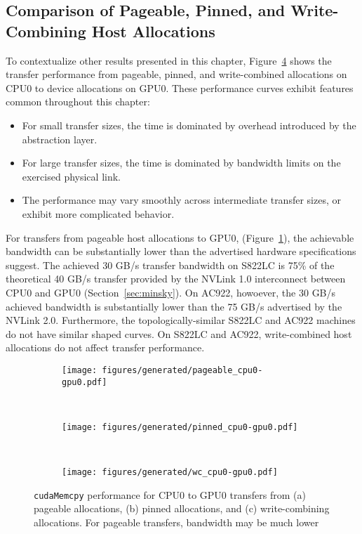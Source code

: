 \subsection{Comparison of Pageable, Pinned, and Write-Combining Host Allocations}
\label{sec:explicit-pageable-pinned-wc}

To contextualize other results presented in this chapter, Figure~\ref{fig:pageable-pinned-wc} shows the transfer performance from pageable, pinned, and write-combined allocations on CPU0 to device allocations on GPU0.
These performance curves exhibit features common throughout this chapter:
\begin{itemize}
\item For small transfer sizes, the time is dominated by overhead introduced by the abstraction layer.
\item For large transfer sizes, the time is dominated by bandwidth limits on the exercised physical link.
\item The performance may vary smoothly across intermediate transfer sizes, or exhibit more complicated behavior.
\end{itemize}

For transfers from pageable host allocations to GPU0, (Figure~\ref{fig:pageable-cpu0-gpu0}), the achievable bandwidth can be substantially lower than the advertised hardware specifications suggest.
The achieved 30 GB/s transfer bandwidth on S822LC is 75\% of the theoretical 40 GB/s transfer provided by the NVLink 1.0 interconnect between CPU0 and GPU0 (Section~\ref{sec:minsky}).
On AC922, howoever, the 30 GB/s achieved bandwidth is substantially lower than the 75 GB/s advertised by the NVLink 2.0.
Furthermore, the topologically-similar S822LC and AC922 machines do not have similar shaped curves.
On S822LC and AC922, write-combined host allocations do not affect transfer performance.

\begin{figure}[ht]
    \centering
    \begin{subfigure}[b]{0.3\textwidth}
        \texttt{[image: figures/generated/pageable\_cpu0-gpu0.pdf]}
        \caption{}
        \label{fig:pageable-cpu0-gpu0}
    \end{subfigure}
    ~
    \begin{subfigure}[b]{0.3\textwidth}
        \texttt{[image: figures/generated/pinned\_cpu0-gpu0.pdf]}
        \caption{}
        \label{fig:}
    \end{subfigure}
    ~
    \begin{subfigure}[b]{0.3\textwidth}
        \texttt{[image: figures/generated/wc\_cpu0-gpu0.pdf]}
        \caption{}
        \label{fig:}
    \end{subfigure}
    \caption[]{
        \texttt{cudaMemcpy} performance for CPU0 to GPU0 transfers from 
        (a) pageable allocations,
        (b) pinned allocations, and
        (c) write-combining allocations.
        For pageable transfers, bandwidth may be much lower 
    }
    \label{fig:pageable-pinned-wc}
\end{figure}

